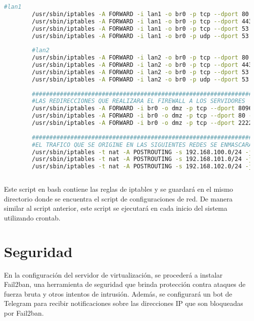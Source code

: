 \begin{lstlisting}[language=Bash, caption=iptables]
		#lan1
		/usr/sbin/iptables -A FORWARD -i lan1 -o br0 -p tcp --dport 80 -j ACCEPT
		/usr/sbin/iptables -A FORWARD -i lan1 -o br0 -p tcp --dport 443 -j ACCEPT
		/usr/sbin/iptables -A FORWARD -i lan1 -o br0 -p tcp --dport 53 -j ACCEPT
		/usr/sbin/iptables -A FORWARD -i lan1 -o br0 -p udp --dport 53 -j ACCEPT
		
		#lan2
		/usr/sbin/iptables -A FORWARD -i lan2 -o br0 -p tcp --dport 80 -j ACCEPT
		/usr/sbin/iptables -A FORWARD -i lan2 -o br0 -p tcp --dport 443 -j ACCEPT
		/usr/sbin/iptables -A FORWARD -i lan2 -o br0 -p tcp --dport 53 -j ACCEPT
		/usr/sbin/iptables -A FORWARD -i lan2 -o br0 -p udp --dport 53 -j ACCEPT
		
		#######################################################################################
		#LAS REDIRECCIONES QUE REALIZARA EL FIREWALL A LOS SERVIDORES
		/usr/sbin/iptables -A FORWARD -i br0 -o dmz -p tcp --dport 8096 -j ACCEPT
		/usr/sbin/iptables -A FORWARD -i br0 -o dmz -p tcp --dport 80 -j ACCEPT
		/usr/sbin/iptables -A FORWARD -i br0 -o dmz -p tcp --dport 2222 -j ACCEPT
		
		#######################################################################################
		#EL TRAFICO QUE SE ORIGINE EN LAS SIGUIENTES REDES SE ENMASCARA
		/usr/sbin/iptables -t nat -A POSTROUTING -s 192.168.100.0/24 -j MASQUERADE
		/usr/sbin/iptables -t nat -A POSTROUTING -s 192.168.101.0/24 -j MASQUERADE
		/usr/sbin/iptables -t nat -A POSTROUTING -s 192.168.102.0/24 -j MASQUERADE
	
		\end{lstlisting}
		
		
		Este script en bash contiene las reglas de iptables y se guardará en el mismo directorio donde se encuentra el script de configuraciones de red. De manera similar al script anterior, este script se ejecutará en cada inicio del sistema utilizando crontab.\par
		
	
		
		\section{Seguridad}
		
		En la configuración del servidor de virtualización, se procederá a instalar Fail2ban, una herramienta de seguridad que brinda protección contra ataques de fuerza bruta y otros intentos de intrusión. Además, se configurará un bot de Telegram para recibir notificaciones sobre las direcciones IP que son bloqueadas por Fail2ban.
		
